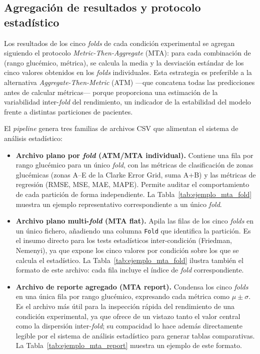 \subsection{Agregación de resultados y protocolo estadístico}
\label{subsec:agregacion_resultados}
Los resultados de los cinco \textit{folds} de cada condición experimental se agregan siguiendo el protocolo \textit{Metric-Then-Aggregate} (MTA): para cada combinación de (rango glucémico, métrica), se calcula la media y la desviación estándar de los cinco valores obtenidos en los \textit{folds} individuales. Esta estrategia es preferible a la alternativa \textit{Aggregate-Then-Metric} (ATM) ---que concatena todas las predicciones antes de calcular métricas--- porque proporciona una estimación de la variabilidad inter-\textit{fold} del rendimiento, un indicador de la estabilidad del modelo frente a distintas particiones de pacientes.

El \textit{pipeline} genera tres familias de archivos CSV que alimentan el sistema de análisis estadístico:

\begin{itemize}
    \item \textbf{Archivo plano por \textit{fold} (ATM/MTA individual).} Contiene una fila por rango glucémico para un único \textit{fold}, con las métricas de clasificación de zonas glucémicas (zonas A--E de la Clarke Error Grid, suma A+B) y las métricas de regresión (RMSE, MSE, MAE, MAPE). Permite auditar el comportamiento de cada partición de forma independiente. La Tabla~\ref{tab:ejemplo_mta_fold} muestra un ejemplo representativo correspondiente a un único \textit{fold}.

    \item \textbf{Archivo plano multi-\textit{fold} (MTA flat).} Apila las filas de los cinco \textit{folds} en un único fichero, añadiendo una columna \texttt{Fold} que identifica la partición. Es el insumo directo para los tests estadísticos inter-condición (Friedman, Nemenyi), ya que expone los cinco valores por condición sobre los que se calcula el estadístico. La Tabla~\ref{tab:ejemplo_mta_fold} ilustra también el formato de este archivo: cada fila incluye el índice de \textit{fold} correspondiente.

    \item \textbf{Archivo de reporte agregado (MTA report).} Condensa los cinco \textit{folds} en una única fila por rango glucémico, expresando cada métrica como \(\mu \pm \sigma\). Es el archivo más útil para la inspección rápida del rendimiento de una condición experimental, ya que ofrece de un vistazo tanto el valor central como la dispersión inter-\textit{fold}; su compacidad lo hace además directamente legible por el sistema de análisis estadístico para generar tablas comparativas. La Tabla~\ref{tab:ejemplo_mta_report} muestra un ejemplo de este formato.
\end{itemize}


